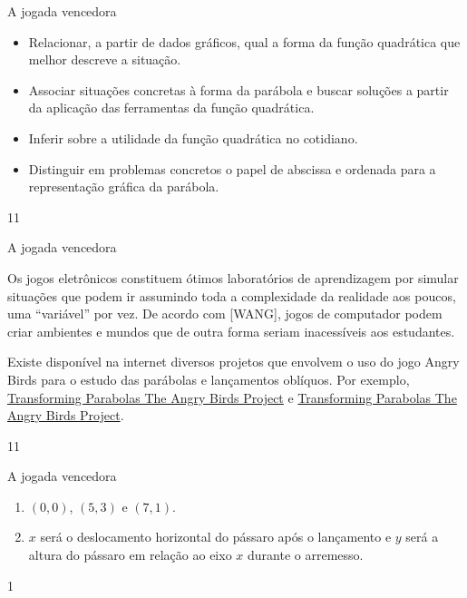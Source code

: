 \begin{objectives}{A jogada vencedora}
{
\begin{itemize}
\item Relacionar, a partir de dados gráficos, qual a forma da função quadrática que melhor descreve a situação.

\item {} 
Associar situações concretas à forma da parábola e buscar soluções a partir da aplicação das ferramentas da função quadrática.

\item {} 
Inferir sobre a utilidade da função quadrática no cotidiano.

\item {} 
Distinguir em problemas concretos o papel de abscissa e ordenada para a representação gráfica da parábola.
\end{itemize}
}{1}{1}
\end{objectives}
\begin{sugestions}{A jogada vencedora}
{
Os jogos eletrônicos constituem ótimos laboratórios de aprendizagem por simular situações que podem ir assumindo toda a complexidade da realidade aos poucos, uma “variável” por vez. De acordo com {[}WANG{]}, jogos de computador podem criar ambientes e mundos que de outra forma seriam inacessíveis aos estudantes.

Existe disponível na internet diversos projetos que envolvem o uso do jogo Angry Birds para o estudo das parábolas e lançamentos oblíquos. Por exemplo, \href{https://algebra2coach.com/transforming-parabolas-angry-birds-project/}{Transforming Parabolas \textendash{} The Angry Birds Project} e \href{https://www.tes.com/teaching-resource/angry-bird-parabolas-graphing-quadratic-equations-6165424}{Transforming Parabolas \textendash{} The Angry Birds Project}.
}{1}{1}
\end{sugestions}
\begin{answer}{A jogada vencedora}
{
\begin{enumerate}
\item {} 
\((0,0)\), \((5,3)\) e \((7,1)\).

\item {} 
\(x\) será o deslocamento horizontal do pássaro após o lançamento e \(y\) será a altura do pássaro em relação ao eixo \(x\) durante o arremesso.
\end{enumerate}
}{1}
\end{answer}
\clearmargin
\marginpar{\vspace{.5em}}
